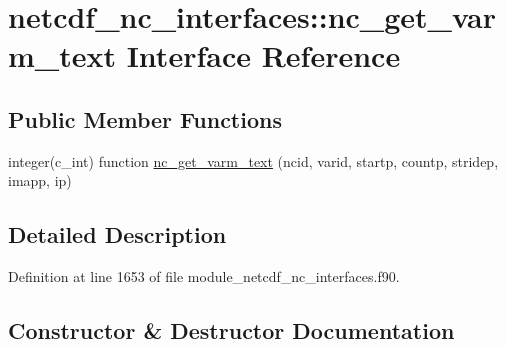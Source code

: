 \hypertarget{interfacenetcdf__nc__interfaces_1_1nc__get__varm__text}{}\section{netcdf\+\_\+nc\+\_\+interfaces\+:\+:nc\+\_\+get\+\_\+varm\+\_\+text Interface Reference}
\label{interfacenetcdf__nc__interfaces_1_1nc__get__varm__text}
\subsection*{Public Member Functions}
\begin{DoxyCompactItemize}
\item 
integer(c\+\_\+int) function \hyperlink{interfacenetcdf__nc__interfaces_1_1nc__get__varm__text_adad67a217bebef0b2d138dff89e886c8}{nc\+\_\+get\+\_\+varm\+\_\+text} (ncid, varid, startp, countp, stridep, imapp, ip)
\end{DoxyCompactItemize}


\subsection{Detailed Description}


Definition at line 1653 of file module\+\_\+netcdf\+\_\+nc\+\_\+interfaces.\+f90.



\subsection{Constructor \& Destructor Documentation}
\mbox{\label{interfacenetcdf__nc__interfaces_1_1nc__get__varm__text_adad67a217bebef0b2d138dff89e886c8}} 

